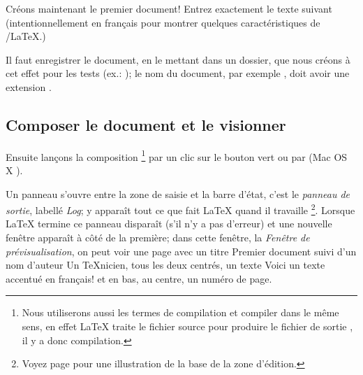 Créons maintenant le premier document! Entrez exactement le texte suivant (intentionnellement en français pour montrer quelques caractéristiques de \Tw/\LaTeX.)


Il faut enregistrer le document, en le mettant dans un dossier, que nous créons à cet effet pour les tests (ex.: ); le nom du document, par exemple , doit avoir une extension . 

\subsection{Composer le document et le visionner}

Ensuite lançons la composition \footnote{Nous utiliserons aussi les termes de compilation et compiler dans le même sens, en effet \LaTeX{} traite le fichier source pour produire le fichier de sortie , il y a donc compilation.} par un clic sur le bouton vert  ou par  (Mac OS X ).

Un panneau s'ouvre entre la zone de saisie et la barre d'état, c'est le \emph{panneau de sortie}, labellé \emph{Log}; y apparaît tout ce que fait \LaTeX{} quand il travaille \footnote{Voyez page \pageref{fig:consoleOutput} pour une illustration de la base de la zone d'édition.}. Lorsque \LaTeX{} termine ce panneau disparaît (s'il n'y a pas d'erreur) et une nouvelle fenêtre apparaît à côté de la première; dans cette fenêtre, la \emph{Fenêtre de prévisualisation}, on peut voir une page avec un titre \og Premier document\fg{} suivi d'un nom d'auteur \og Un TeXnicien\fg, tous les deux centrés, un texte \og Voici un texte accentué en français!\fg{} et en bas, au centre, un numéro de page.

